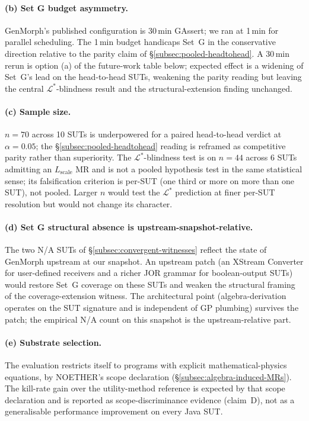 \paragraph{(b) Set G budget asymmetry.}
GenMorph's published configuration is 30\,min GAssert; we ran at
1\,min for parallel scheduling. The 1\,min budget handicaps Set~G in
the conservative direction relative to the parity claim of
\S\ref{subsec:pooled-headtohead}. A 30\,min rerun is option (a) of
the future-work table below; expected effect is a widening of
Set~G's lead on the head-to-head SUTs, weakening the parity reading
but leaving the central $\mathcal{L}^{*}$-blindness result and the
structural-extension finding unchanged.

\paragraph{(c) Sample size.}
$n = 70$ across 10 SUTs is underpowered for a paired
head-to-head verdict at $\alpha = 0.05$; the
\S\ref{subsec:pooled-headtohead} reading is reframed as competitive
parity rather than superiority. The
$\mathcal{L}^{*}$-blindness test is on $n = 44$ across 6 SUTs
admitting an $L_{\mathrm{scale}}$ MR and is not a pooled hypothesis
test in the same statistical sense; its falsification criterion is
per-SUT (one third or more on more than one SUT), not pooled. Larger
$n$ would test the $\mathcal{L}^{*}$ prediction at finer per-SUT
resolution but would not change its character.

\paragraph{(d) Set G structural absence is upstream-snapshot-relative.}
The two N/A SUTs of \S\ref{subsec:convergent-witnesses} reflect the
state of GenMorph upstream at our snapshot. An upstream patch (an
XStream Converter for user-defined receivers and a richer JOR grammar
for boolean-output SUTs) would restore Set~G coverage on these SUTs
and weaken the structural framing of the coverage-extension witness.
The architectural point (algebra-derivation operates on the SUT
signature and is independent of GP plumbing) survives the patch; the
empirical N/A count on this snapshot is the upstream-relative part.

\paragraph{(e) Substrate selection.}
The evaluation restricts itself to programs with explicit
mathematical-physics equations, by NOETHER's scope declaration
(\S\ref{subsec:algebra-induced-MRs}). The kill-rate gain over the
utility-method reference is expected by that scope declaration and is
reported as scope-discriminance evidence (claim~D), not as a
generalisable performance improvement on every Java SUT.

